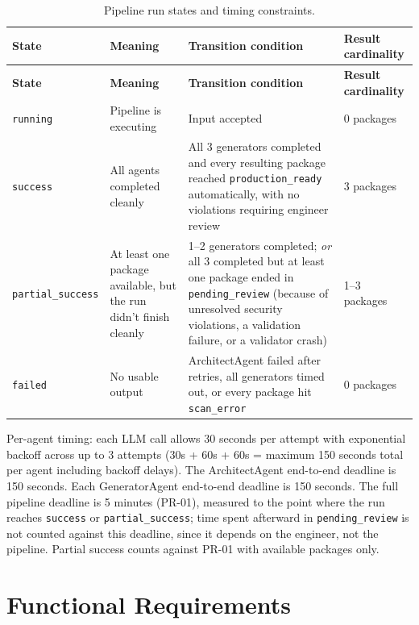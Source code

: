 \begin{longtable}{@{}p{}p{}p{}p{}@{}}
\caption{Pipeline run states and timing constraints.}\label{tab:states}\\
\toprule
\textbf{State} & \textbf{Meaning} & \textbf{Transition condition} &
  \textbf{Result cardinality} \\
\midrule
\endfirsthead
\toprule
\textbf{State} & \textbf{Meaning} & \textbf{Transition condition} &
  \textbf{Result cardinality} \\
\midrule
\endhead
\texttt{running} & Pipeline is executing & Input accepted & 0 packages \\
\texttt{success} & All agents completed cleanly & All 3 generators
  completed and every resulting package reached
  \texttt{production\_ready} automatically, with no violations requiring
  engineer review & 3 packages \\
\texttt{partial\_success} & At least one package available, but the run
  didn't finish cleanly & 1--2 generators completed; \emph{or} all 3
  completed but at least one package ended in \texttt{pending\_review}
  (because of unresolved security violations, a validation failure, or a
  validator crash) & 1--3 packages \\
\texttt{failed} & No usable output & ArchitectAgent failed after retries,
  all generators timed out, or every package hit \texttt{scan\_error} &
  0 packages \\
\bottomrule
\end{longtable}

Per-agent timing: each LLM call allows 30 seconds per attempt with
exponential backoff across up to 3 attempts (30s + 60s + 60s = maximum
150 seconds total per agent including backoff delays). The ArchitectAgent
end-to-end deadline is 150 seconds. Each GeneratorAgent end-to-end deadline
is 150 seconds. The full pipeline deadline is 5 minutes (PR-01), measured
to the point where the run reaches \texttt{success} or
\texttt{partial\_success}; time spent afterward in \texttt{pending\_review}
is not counted against this deadline, since it depends on the engineer, not
the pipeline. Partial success counts against PR-01 with available packages
only.

\section{Functional Requirements}
\label{sec:functional}

